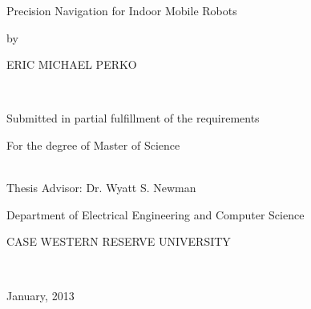 \begin{titlepage}
    \begin{doublespace}
        \begin{center}
            \vspace*{0.5in}

            { \Large Precision Navigation for Indoor Mobile Robots }\\[0.5in]

            { \large by
            
            ERIC MICHAEL PERKO }\\[0.5in]

            { \large Submitted in partial fulfillment of the requirements
            
            For the degree of Master of Science}\\[0.5in]

            { \large Thesis Advisor: Dr. Wyatt S. Newman}\\[0.5in]

            { \large Department of Electrical Engineering and Computer Science
            
            CASE WESTERN RESERVE UNIVERSITY}\\[0.5in]

            \vfill

            { \large January, 2013}\\[0.5in]
        \end{center}
    \end{doublespace}
\end{titlepage}